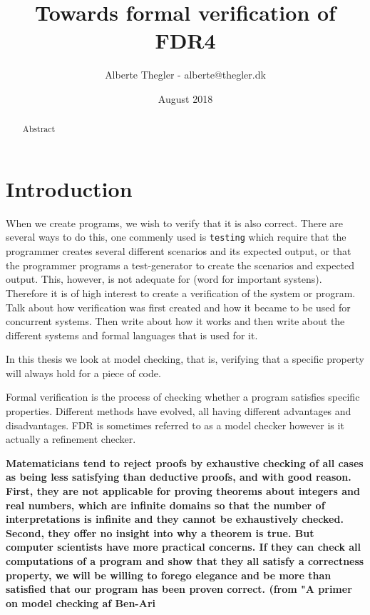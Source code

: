 \documentclass[a4paper]{report}
\title{Towards formal verification of FDR4}
\author{Alberte Thegler - alberte@thegler.dk}
\date{August 2018}
\begin{document}
\maketitle

\begin{abstract}
\begin{doublespace}
Abstract

\end{doublespace}
\end{abstract}



\newpage
\tableofcontents

\newpage
\listoftodos
\newpage
{}
\chapter{Introduction}
When we create programs, we wish to verify that it is also correct. There are several ways to do this, one commenly used is \texttt{testing} which require that the programmer creates several different scenarios and its expected output, or that the programmer programs a test-generator to create the scenarios and expected output. This, however, is not adequate for (word for important systens). Therefore it is of high interest to create a verification of the system or program.\\
Talk about how verification was first created and how it became to be used for concurrent systems. Then write about how it works and then write about the different systems and formal languages that is used for it. 


In this thesis we look at model checking, that is, verifying that a specific property will always hold for a piece of code.


Formal verification is the process of checking whether a program satisfies specific properties. Different methods have evolved, all having different advantages and disadvantages. FDR is sometimes referred to as a model checker however is it actually a refinement checker.



\textbf{Matematicians tend to reject proofs by exhaustive checking of all cases as being less satisfying than deductive proofs, and with good reason. First, they are not applicable for proving theorems about integers and real numbers, which are infinite domains so that the number of interpretations is infinite and they cannot be exhaustively checked. Second, they offer no insight into why a theorem is true. But computer scientists have more practical concerns. If they can check all computations of a program and show that they all satisfy a correctness property, we will be willing to forego elegance and be more than satisfied that our program has been proven correct. (from "A primer on model checking af Ben-Ari} \cite{Ben-ari2010}
\end{document}
